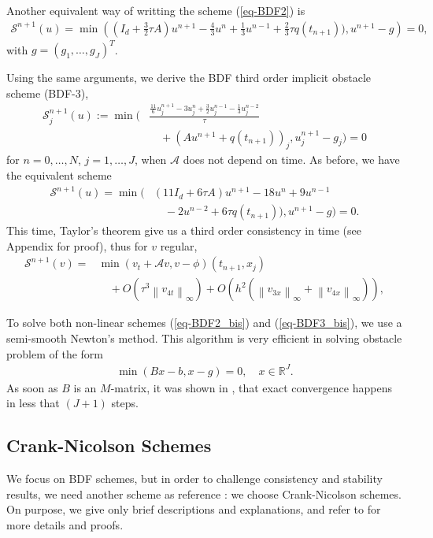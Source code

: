 \documentclass[12pt,a4paper]{article}
\newcommand{\ninf}[1]{\left\| {#1} \right\|_\infty}
\newcommand{\reel}{\mathbb{R}}
\begin{document}
Another equivalent way of writting the scheme (\ref{eq-BDF2}) is
\begin{align}
	\mathcal{S}^{n+1} (u) = \min\left( (I_d +\frac{3}{2} \tau A) u^{n+1} - \frac{4}{3} u^n + \frac{1}{3} u^{n-1} + \frac{2}{3} \tau q(t_{n+1})), u^{n+1} - g \right) = 0, \label{eq-BDF2_bis}
\end{align}
with $g = (g_1, \dots, g_J)^T$.

Using the same arguments, we derive the BDF third order implicit obstacle scheme (BDF-3),
\begin{align}
	\mathcal{S}_j^{n+1} (u) := \min\bigg( &\frac{\frac{11}{6} u_j^{n+1} - 3 u_j^n + \frac{3}{2} u_j^{n-1} - \frac{1}{3} u_j^{n-2}}{\tau} \nonumber\\
	& \quad + (A u^{n+1} + q(t_{n+1}))_j, u_j^{n+1} - g_j \bigg) = 0 \label{eq-BDF3}
\end{align}
for $n=0,\dots,N$, $j=1,\dots,J$, when $\mathcal{A}$ does not depend on time. As before, we have the equivalent scheme
\begin{align}
	\mathcal{S}^{n+1} (u) = \min\bigg( & (11 I_d + 6 \tau A) u^{n+1} - 18 u^n + 9 u^{n-1} \nonumber\\ 
	& \quad - 2 u^{n-2} + 6 \tau q(t_{n+1})), u^{n+1} - g \bigg) = 0. \label{eq-BDF3_bis}
\end{align}
This time, Taylor's theorem give us a third order consistency in time (see Appendix for proof), thus for $v$ regular,
\begin{align*}
	\mathcal{S}^{n+1} (v) = & \min (v_t + \mathcal{A}v, v-\phi)(t_{n+1}, x_j) \\ 
		& \quad + O(\tau^3 \ninf{v_{4t}}) + O(h^2 (\ninf{v_{3x}} + \ninf{v_{4x}})),
\end{align*}

To solve both non-linear schemes (\ref{eq-BDF2_bis}) and (\ref{eq-BDF3_bis}), we use a semi-smooth Newton's method. This algorithm is very efficient in solving obstacle problem of the form
\begin{align}
	\min (Bx - b, x-g) = 0, \quad x \in \reel^J. \label{eq-Newton}
\end{align}
As soon as $B$ is an $M$-matrix, it was shown in \cite{MR2551155}, that exact convergence happens in less that $(J+1)$ steps.

	\subsection{Crank-Nicolson Schemes}

We focus on BDF schemes, but in order to challenge consistency and stability results, we need another scheme as reference : we choose Crank-Nicolson schemes. On purpose, we give only brief descriptions and explanations, and refer to \cite{Boka} for more details and proofs.
\end{document}
